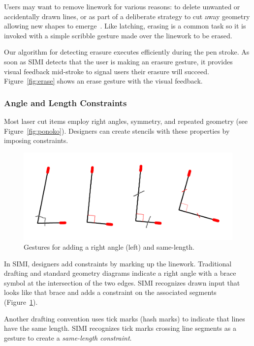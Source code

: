 \documentclass{article}
\begin{document}
Users may want to remove linework for various reasons: to delete
unwanted or accidentally drawn lines, or as part of a deliberate
strategy to cut away geometry allowing new shapes to
emerge~\cite{zeleznik-lineogrammer}. Like latching, erasing is a
common task so it is invoked with a simple scribble gesture made over
the linework to be erased.

Our algorithm for detecting erasure executes efficiently during the
pen stroke. As soon as SIMI detects that the user is making an erasure
gesture, it provides visual feedback mid-stroke to signal users their
erasure will succeed. Figure~\ref{fig:erase} shows an erase gesture
with the visual feedback.

\subsubsection{Angle and Length Constraints}

Most laser cut items employ right angles, symmetry, and repeated
geometry (see Figure~\ref{fig:ponoko}). Designers can create stencils
with these properties by imposing constraints.

\begin{figure}[h]
  \centering
  \includegraphics[width=0.9\linewidth]{img/constraints-all.pdf}
  \caption{Gestures for adding a right angle (left) and same-length.}
  \label{fig:constraints}
\end{figure}

In SIMI, designers add constraints by marking up the
linework. Traditional drafting and standard geometry diagrams indicate
a right angle with a brace symbol at the intersection of the two
edges. SIMI recognizes drawn input that looks like that brace and adds
a constraint on the associated segments
(Figure~\ref{fig:constraints}).

Another drafting convention uses tick marks (hash marks) to indicate
that lines have the same length. SIMI recognizes tick marks crossing line
segments as a gesture to create a \textit{same-length constraint}.
\end{document}
